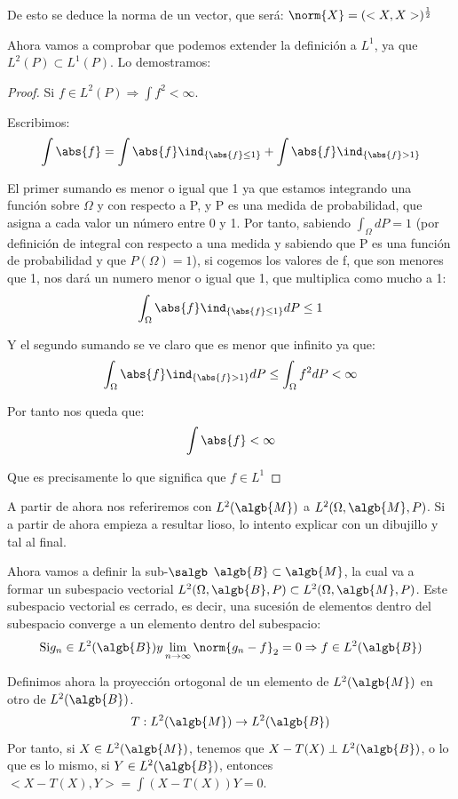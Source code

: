 \documentclass{apuntes}
\begin{document}
De esto se deduce la norma de un vector, que será: $\norm{X}=(<X,X>)^{\frac{1}{2}}$

Ahora vamos a comprobar que podemos extender la definición a $L^1$, ya que $L^2(P) \subset L^1(P)$. Lo demostramos:

\begin{proof}
Si $f \in L^2(P) \Rightarrow \int f^2 < \infty$.

Escribimos: 
\[
\int \abs{f} = \int \abs{f}\ind_{\{\abs{f}\leq 1\}} + \int \abs{f}\ind_{\{\abs{f}> 1\}}
\]

El primer sumando es menor o igual que 1 ya que estamos integrando una función sobre $\Omega$ y con respecto a P, y P es una medida de probabilidad, que asigna a cada valor un número entre 0 y 1. Por tanto, sabiendo $\int_{\Omega}dP = 1$ (por definición de integral con respecto a una medida y sabiendo que P es una función de probabilidad y que $P(\Omega)=1$), si cogemos los valores de f, que son menores que 1, nos dará un numero menor o igual que 1, que multiplica como mucho a 1:
\[
\int_{\Omega} \abs{f}\ind_{\{\abs{f}\leq 1\}}dP \leq 1
\]

Y el segundo sumando se ve claro que es menor que infinito ya que:
\[
 \int_{\Omega} \abs{f}\ind_{\{\abs{f}> 1\}}dP \leq  \int_{\Omega} f^2 dP < \infty
\]

Por tanto nos queda que:
\[
\int \abs{f} < \infty
\]

Que es precisamente lo que significa que $f\in L^1$
\end{proof}


A partir de ahora nos referiremos con $L^2(\algb{M})$ a $L^2(\Omega,\algb{M},P)$.
Si a partir de ahora empieza a resultar lioso, lo intento explicar con un dibujillo y tal al final.

Ahora vamos a definir la sub-$\salgb$ $\algb{B} \subset \algb{M}$, la cual va a formar un subespacio vectorial $L^2(\Omega,\algb{B},P) \subset L^2(\Omega,\algb{M},P)$. Este subespacio vectorial es cerrado, es decir, una sucesión de elementos dentro del subespacio converge a un elemento dentro del subespacio:
\[
\text{Si} g_n \in L^2(\algb{B}) y \lim_{n \rightarrow \infty} \norm{g_n -f}_2 = 0 \Rightarrow f \in L^2(\algb{B}) 
\]

Definimos ahora la proyección ortogonal de un elemento de $L^2(\algb{M})$ en otro de $L^2(\algb{B})$.
\[
T: L^2(\algb{M}) \rightarrow L^2(\algb{B})
\]
Por tanto, si $X\in L^2(\algb{M})$, tenemos que $X-T(X) \perp L^2(\algb{B})$, o lo que es lo mismo, si $Y \in L^2(\algb{B})$, entonces $<X-T(X),Y>=\int(X-T(X))Y = 0$.
\end{document}

